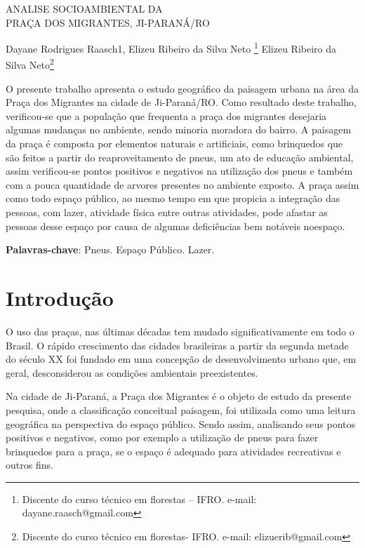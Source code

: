 \documentclass[article,12pt,onesidea,4paper,english,brazil]{abntex2}
\begin{document}
	
	
	\frenchspacing 
	
	\begin{center}
		\LARGE ANALISE SOCIOAMBIENTAL DA\\PRAÇA DOS MIGRANTES, JI-PARANÁ/RO
		
		\normalsize
	Dayane Rodrigues Raasch1, Elizeu Ribeiro da Silva Neto \footnote{Discente do curso técnico em florestas – IFRO. e-mail: dayane.raasch@gmail.com} 
	Elizeu Ribeiro da Silva Neto\footnote{Discente do curso técnico em florestas- IFRO. e-mail: elizuerib@gmail.com} 
	
	\end{center}
	
	\begin{resumoumacoluna}
		O presente trabalho apresenta o estudo geográfico da paisagem urbana na área da Praça dos Migrantes na cidade de Ji-Paraná/RO. Como resultado deste trabalho, verificou-se que a população que frequenta a praça dos migrantes desejaria algumas mudanças no ambiente, sendo minoria moradora do bairro. A paisagem da praça é composta por elementos naturais e artificiais, como brinquedos que são feitos a partir do reaproveitamento de pneus, um ato de educação ambiental, assim verificou-se pontos positivos e negativos na utilização dos pneus e também com a pouca quantidade de arvores presentes no ambiente exposto. A praça assim como todo espaço público, ao mesmo tempo em que propicia a integração das pessoas, com lazer, atividade física entre outras atividades, pode afastar as pessoas desse espaço por causa de algumas deficiências bem notáveis noespaço.
	
		
		\vspace{\onelineskip}
		
		\noindent
		\textbf{Palavras-chave}: Pneus. Espaço Público. Lazer.
	\end{resumoumacoluna}
	
	\section*{Introdução}
	
	O uso das praças, nas últimas décadas tem mudado significativamente em todo o Brasil. O rápido crescimento das cidades brasileiras a partir da segunda metade do século XX foi fundado em uma concepção de desenvolvimento urbano que, em geral, desconsiderou as condições ambientais preexistentes.
	
	Na cidade de Ji-Paraná, a Praça dos Migrantes é o objeto de estudo da presente pesquisa, onde a classificação conceitual paisagem, foi utilizada como uma leitura geográfica na perspectiva do espaço público. Sendo assim, analisando seus pontos positivos e negativos, como por exemplo a utilização de pneus para fazer brinquedos para a praça, se o espaço é adequado para atividades recreativas e outros fins.
	
\end{document}
